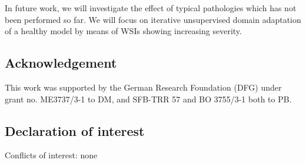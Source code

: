 \documentclass{elsarticle}
\begin{document}
In future work, we will investigate the effect of typical pathologies which has not been performed so far. We will focus on iterative unsupervised domain adaptation of a healthy model by means of WSIs showing increasing severity. 

\subsection*{Acknowledgement}
This work was supported by the German Research Foundation (DFG) under
grant no. ME3737/3-1 to DM, and SFB-TRR 57 and BO 3755/3-1 both to PB. 


\subsection*{Declaration of interest}
Conflicts of interest: none
\end{document}
